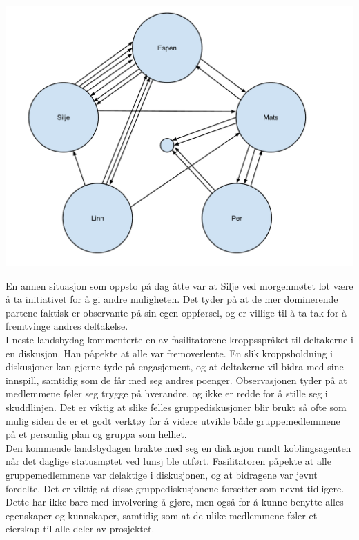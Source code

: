 \begin{center}
\includegraphics[clip=true, width=1 \textwidth,
trim=0cm 0cm 0cm 0cm]{Sosiogram2.pdf}
\label{fig:sosiogram2}
\end{center}

En annen situasjon som oppsto på dag åtte var at Silje ved morgenmøtet lot være å ta initiativet for å gi andre muligheten. Det tyder på at de mer dominerende partene faktisk er observante på sin egen oppførsel, og er villige til å ta tak for å fremtvinge andres deltakelse.\\

I neste landsbydag kommenterte en av fasilitatorene kroppsspråket til deltakerne i en diskusjon. Han påpekte at alle var fremoverlente. En slik kroppsholdning i diskusjoner kan gjerne tyde på engasjement, og at deltakerne vil bidra med sine innspill, samtidig som de får med seg andres poenger. Observasjonen tyder på at medlemmene føler seg trygge på hverandre, og ikke er redde for å stille seg i skuddlinjen. Det er viktig at slike felles gruppediskusjoner blir brukt så ofte som mulig siden de er et godt verktøy for å videre utvikle både gruppemedlemmene på et personlig plan og gruppa som helhet.\\

Den kommende landsbydagen brakte med seg en diskusjon rundt koblingsagenten når det daglige statusmøtet ved lunsj ble utført. Fasilitatoren påpekte at alle gruppemedlemmene var delaktige i diskusjonen, og at bidragene var jevnt fordelte. Det er viktig at disse gruppediskusjonene forsetter som nevnt tidligere. Dette har ikke bare med involvering å gjøre, men også for å kunne benytte alles egenskaper og kunnskaper, samtidig som at de ulike medlemmene føler et eierskap til alle deler av prosjektet.\\

